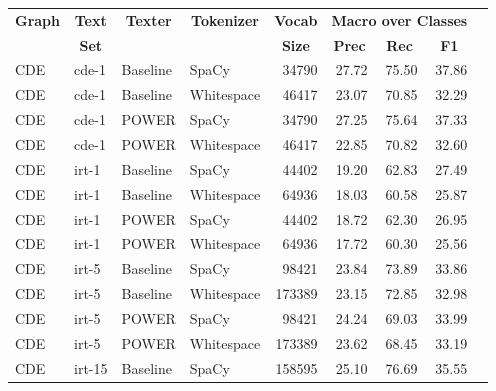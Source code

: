 \begin{tabular}{| l | l | l | l | r | r | r | r | r |}
    \hline

    \multicolumn{1}{|c|}{\textbf{Graph}} &
    \multicolumn{1}{|c|}{\textbf{Text}} &
    \multicolumn{1}{|c|}{\textbf{Texter}} &
    \multicolumn{1}{|c|}{\textbf{Tokenizer}} &
    \multicolumn{1}{|c|}{\textbf{Vocab}} &
    \multicolumn{3}{|c|}{\textbf{Macro over Classes}} \\

    \multicolumn{1}{|c|}{} &
    \multicolumn{1}{|c|}{\textbf{Set}} &
    \multicolumn{1}{|c|}{} &
    \multicolumn{1}{|c|}{} &
    \multicolumn{1}{|c|}{\textbf{Size}} &
    \multicolumn{1}{|c|}{\textbf{Prec}} &
    \multicolumn{1}{|c|}{\textbf{Rec}} &
    \multicolumn{1}{|c|}{\textbf{F1}} \\

    \hline \hline

    CDE & cde-1 & Baseline & SpaCy & \num{34790} & 27.72 & 75.50 & 37.86 \\
    CDE & cde-1 & Baseline & Whitespace & \num{46417} & 23.07 & 70.85 & 32.29 \\
    CDE & cde-1 & POWER & SpaCy & \num{34790} & 27.25 & 75.64 & 37.33 \\
    CDE & cde-1 & POWER & Whitespace & \num{46417} & 22.85 & 70.82 & 32.60 \\ \hline

    CDE & irt-1 & Baseline & SpaCy & \num{44402} & 19.20 & 62.83 & 27.49 \\
    CDE & irt-1 & Baseline & Whitespace & \num{64936} & 18.03 & 60.58 & 25.87 \\
    CDE & irt-1 & POWER & SpaCy & \num{44402} & 18.72 & 62.30 & 26.95 \\
    CDE & irt-1 & POWER & Whitespace & \num{64936} & 17.72 & 60.30 & 25.56 \\ \hline

    CDE & irt-5 & Baseline & SpaCy & \num{98421} & 23.84 & 73.89 & 33.86 \\
    CDE & irt-5 & Baseline & Whitespace & \num{173389} & 23.15 & 72.85 & 32.98 \\
    CDE & irt-5 & POWER & SpaCy & \num{98421} & 24.24 & 69.03 & 33.99 \\
    CDE & irt-5 & POWER & Whitespace & \num{173389} & 23.62 & 68.45 & 33.19 \\ \hline

    CDE & irt-15 & Baseline & SpaCy & \num{158595} &
    25.10 & 76.69 & 35.55 \\


\end{tabular}

